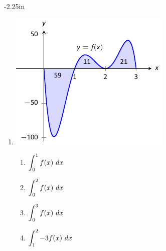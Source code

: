 \begin{adjustwidth*}{}{-2.25in}
\begin{multicols*}{2}

\begin{enumerate}[1),resume]
\item \noindent
\begin{minipage}{\linewidth}
\includegraphics[scale=.8]{figures/fig05_02_ex_10}
\end{minipage}
\bmtwo
\begin{enumerate}
\item		$\displaystyle \int_0^1 f(x)\ dx$
\item		$\displaystyle \int_0^2 f(x)\ dx$
\item		$\displaystyle \int_0^3 f(x)\ dx$
\item		$\ds \int_1^2 -3f(x)\ dx$
\end{enumerate}
\emtwo


\end{enumerate}

\end{multicols*}
\end{adjustwidth*}

\clearpage

